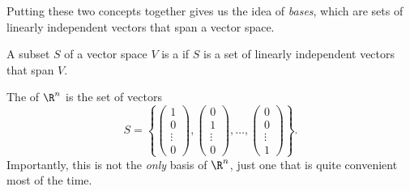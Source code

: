 



Putting these two concepts together gives us the idea of \emph{bases}, which are sets of linearly independent vectors that span a vector space.

\begin{definition}[Basis]
    A subset $S$ of a vector space $V$ is a  if $S$ is a set of linearly independent vectors that span $V$.
\end{definition}

\begin{example}
    The  of $\R^n$ is the set of vectors
    $$
    S = \left\{
        \begin{pmatrix}1 \\ 0 \\ \vdots \\ 0\end{pmatrix},
        \begin{pmatrix}0 \\ 1 \\ \vdots \\ 0\end{pmatrix},
        \dots,
        \begin{pmatrix}0 \\ 0 \\ \vdots \\ 1\end{pmatrix}
    \right\}.
    $$
    Importantly, this is not the \emph{only} basis of $\R^n$, just one that is quite convenient most of the time.
\end{example}

